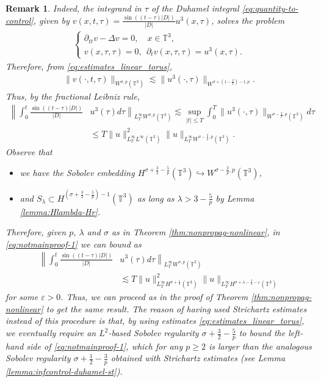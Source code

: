 \documentclass[a4paper, reqno, 11pt]{amsart}
\newtheorem{remark}[theorem]{Remark}
\theoremstyle{definition}
\begin{document}
\begin{remark}
	Indeed, the integrand in $\tau$ of the Duhamel integral \eqref{eq:quantity-to-control}, given by $v(x,t,\tau) = \frac{\sin((t-\tau)|D|)}{|D|} u^3(x,\tau)$, solves the problem
	\begin{align*}
    \left\{
			\begin{array}{l}
				\partial_{tt} v - \Delta v = 0, \quad x \in \mathbb{T}^3, \quad
				\\
				v(x,\tau,\tau) = 0,  \ \ \partial_t v(x,\tau,\tau) = u^3(x,\tau).
			\end{array}
			\right.
	\end{align*}
	Therefore, from \eqref{eq:estimates_linear_torus},
	\begin{align*}
	\|v(\cdot,t,\tau)\|_{W^{\sigma,p}(\mathbb{T}^3)} \lesssim \|u^3(\cdot,\tau)\|_{W^{\sigma + \left(1 - \frac{2}{p}\right) - 1,p}}.
	\end{align*}
	Thus, by the fractional Leibniz rule,
	\begin{align}\label{eq:notmainproof-1}
	\left\| \int_0^t \frac{\sin((t-\tau)|D|)}{|D|} \right. & \left. u^3(\tau) d\tau \right\|_{L^{\infty}_T W^{\sigma,p}(\mathbb{T}^3)} \lesssim \sup_{|t| \leq T} \int_0^T \| u^3(\cdot,\tau)\|_{W^{\sigma - \frac{2}{p},p}(\mathbb{T}^3)}  d\tau \nonumber \\
	&\leq T \| u \|^2_{L^{\infty}_T L^{\infty}(\mathbb{T}^3)}\| u\|_{L^{\infty}_T W^{\sigma - \frac{2}{p},p}(\mathbb{T}^3)}.
	\end{align}
	Observe that 
\begin{itemize}
\item we have the Sobolev embedding $H^{\sigma + \frac{3}{2} - \frac{5}{p}}(\mathbb{T}^3) \hookrightarrow W^{\sigma - \frac{2}{p},p}(\mathbb{T}^3)$,
\item and $S_{\lambda} \subset H^{(\sigma + \frac{3}{2} - \frac{5}{p}) - 1}(\mathbb{T}^3)$ as long as $\lambda > 3 - \frac{5}{p}$ by Lemma \ref{lemma:Hlambda-Hr}.
\end{itemize}	
Therefore, given $p$, $\lambda$ and $\sigma$ as in Theorem \ref{thm:nonpropag-nonlinear}, in \eqref{eq:notmainproof-1} we can bound as
\begin{align*}
\left\| \int_0^t \frac{\sin((t-\tau)|D|)}{|D|} \right. & \left. u^3(\tau) d\tau \right\|_{L^{\infty}_T W^{\sigma,p}(\mathbb{T}^3)} \nonumber \\
	&\lesssim T \| u \|^2_{L^{\infty}_T H^{\sigma + \frac{1}{2}}(\mathbb{T}^3)}\| u\|_{L^{\infty}_T H^{\sigma + \lambda - \frac{3}{2} - \varepsilon}(\mathbb{T}^3)}
\end{align*}
for some $\varepsilon > 0$. Thus, we can proceed as in the proof of Theorem \ref{thm:nonpropag-nonlinear} to get the same result. The reason of having used Strichartz estimates instead of this procedure is that, by using estimates \eqref{eq:estimates_linear_torus}, we eventually require an $L^2$-based Sobolev regularity $\sigma + \frac{3}{2} - \frac{5}{p}$ to bound the left-hand side of \eqref{eq:notmainproof-1}, which for any $p \geq 2$ is larger than the analogous Sobolev regularity $\sigma + \frac{1}{2} - \frac{3}{p}$ obtained with Strichartz estimates (see Lemma \ref{lemma:infcontrol-duhamel-st}).
	\end{remark}
	
\end{document}
